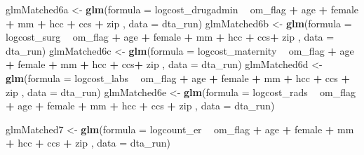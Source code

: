 \documentclass[]{article}
\newenvironment{Shaded}{\begin{snugshade}}{\end{snugshade}}
\newcommand{\KeywordTok}[1]{\textcolor[rgb]{0.13,0.29,0.53}{\textbf{#1}}}
\newcommand{\DataTypeTok}[1]{\textcolor[rgb]{0.13,0.29,0.53}{#1}}
\newcommand{\StringTok}[1]{\textcolor[rgb]{0.31,0.60,0.02}{#1}}
\newcommand{\OperatorTok}[1]{\textcolor[rgb]{0.81,0.36,0.00}{\textbf{#1}}}
\newcommand{\NormalTok}[1]{#1}
\begin{document}
\begin{Shaded}
\begin{Highlighting}[]
\NormalTok{glmMatched6a <-}\StringTok{ }\KeywordTok{glm}\NormalTok{(}\DataTypeTok{formula =}\NormalTok{ logcost_drugadmin }\OperatorTok{~}\StringTok{ }\NormalTok{om_flag }\OperatorTok{+}\StringTok{ }\NormalTok{age }\OperatorTok{+}\StringTok{ }\NormalTok{female }\OperatorTok{+}\StringTok{ }\NormalTok{mm }\OperatorTok{+}\StringTok{ }\NormalTok{hcc }\OperatorTok{+}\StringTok{ }\NormalTok{ccs }\OperatorTok{+}\StringTok{ }\NormalTok{zip ,}
                   \DataTypeTok{data    =}\NormalTok{ dta_run)}
\NormalTok{glmMatched6b <-}\StringTok{ }\KeywordTok{glm}\NormalTok{(}\DataTypeTok{formula =}\NormalTok{ logcost_surg }\OperatorTok{~}\StringTok{ }\NormalTok{om_flag }\OperatorTok{+}\StringTok{ }\NormalTok{age }\OperatorTok{+}\StringTok{ }\NormalTok{female }\OperatorTok{+}\StringTok{ }\NormalTok{mm }\OperatorTok{+}\StringTok{ }\NormalTok{hcc }\OperatorTok{+}\StringTok{ }\NormalTok{ccs}\OperatorTok{+}\StringTok{ }\NormalTok{zip  ,}
                   \DataTypeTok{data    =}\NormalTok{ dta_run)}
\NormalTok{glmMatched6c <-}\StringTok{ }\KeywordTok{glm}\NormalTok{(}\DataTypeTok{formula =}\NormalTok{ logcost_maternity }\OperatorTok{~}\StringTok{ }\NormalTok{om_flag }\OperatorTok{+}\StringTok{ }\NormalTok{age }\OperatorTok{+}\StringTok{ }\NormalTok{female }\OperatorTok{+}\StringTok{ }\NormalTok{mm }\OperatorTok{+}\StringTok{ }\NormalTok{hcc }\OperatorTok{+}\StringTok{ }\NormalTok{ccs}\OperatorTok{+}\StringTok{ }\NormalTok{zip  ,}
                   \DataTypeTok{data    =}\NormalTok{ dta_run)}
\NormalTok{glmMatched6d <-}\StringTok{ }\KeywordTok{glm}\NormalTok{(}\DataTypeTok{formula =}\NormalTok{ logcost_labs }\OperatorTok{~}\StringTok{ }\NormalTok{om_flag }\OperatorTok{+}\StringTok{ }\NormalTok{age }\OperatorTok{+}\StringTok{ }\NormalTok{female }\OperatorTok{+}\StringTok{ }\NormalTok{mm }\OperatorTok{+}\StringTok{ }\NormalTok{hcc }\OperatorTok{+}\StringTok{ }\NormalTok{ccs }\OperatorTok{+}\StringTok{ }\NormalTok{zip ,}
                   \DataTypeTok{data    =}\NormalTok{ dta_run)}
\NormalTok{glmMatched6e <-}\StringTok{ }\KeywordTok{glm}\NormalTok{(}\DataTypeTok{formula =}\NormalTok{ logcost_rads }\OperatorTok{~}\StringTok{ }\NormalTok{om_flag }\OperatorTok{+}\StringTok{ }\NormalTok{age }\OperatorTok{+}\StringTok{ }\NormalTok{female }\OperatorTok{+}\StringTok{ }\NormalTok{mm }\OperatorTok{+}\StringTok{ }\NormalTok{hcc }\OperatorTok{+}\StringTok{ }\NormalTok{ccs }\OperatorTok{+}\StringTok{ }\NormalTok{zip ,}
                   \DataTypeTok{data    =}\NormalTok{ dta_run)}


\NormalTok{glmMatched7 <-}\StringTok{ }\KeywordTok{glm}\NormalTok{(}\DataTypeTok{formula =}\NormalTok{ logcount_er }\OperatorTok{~}\StringTok{ }\NormalTok{om_flag }\OperatorTok{+}\StringTok{ }\NormalTok{age }\OperatorTok{+}\StringTok{ }\NormalTok{female }\OperatorTok{+}\StringTok{ }\NormalTok{mm }\OperatorTok{+}\StringTok{ }\NormalTok{hcc }\OperatorTok{+}\StringTok{ }\NormalTok{ccs }\OperatorTok{+}\StringTok{ }\NormalTok{zip ,}
                   \DataTypeTok{data    =}\NormalTok{ dta_run)}



\end{Highlighting}
\end{Shaded}
\end{document}
